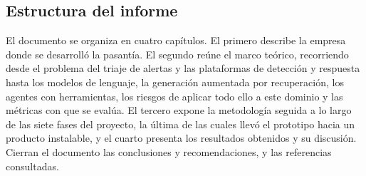 \subsection*{Estructura del informe}

El documento se organiza en cuatro capítulos. El primero describe la empresa donde se desarrolló
la pasantía. El segundo reúne el marco teórico, recorriendo desde el problema del triaje de
alertas y las plataformas de detección y respuesta hasta los modelos de lenguaje, la generación
aumentada por recuperación, los agentes con herramientas, los riesgos de aplicar todo ello a este
dominio y las métricas con que se evalúa. El tercero expone la metodología seguida a lo largo de las siete fases del proyecto, la
última de las cuales llevó el prototipo hacia un producto instalable, y el cuarto presenta los
resultados obtenidos y su discusión. Cierran el documento las conclusiones y
recomendaciones, y las referencias consultadas.
